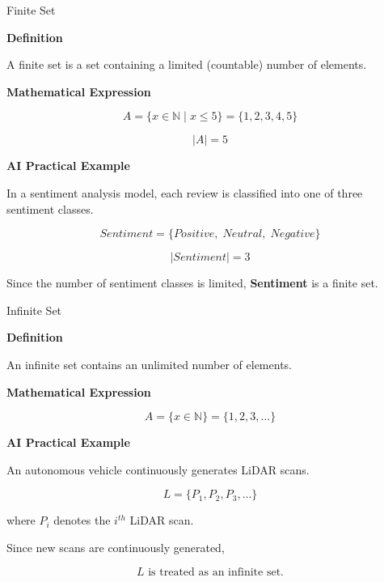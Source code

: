 \documentclass[aspectratio=169]{beamer}
\begin{document}
\begin{frame}{Finite Set}

\textbf{Definition}

A finite set is a set containing a limited (countable) number of elements.

\vspace{0.3cm}

\textbf{Mathematical Expression}

\[
A=\{x\in\mathbb{N}\mid x\le5\}
=\{1,2,3,4,5\}
\]

\[
|A|=5
\]

\vspace{0.4cm}

\textbf{AI Practical Example}

In a sentiment analysis model, each review is classified into one of three sentiment classes.

\[
Sentiment=
\{
Positive,\;
Neutral,\;
Negative
\}
\]

\[
|Sentiment|=3
\]

Since the number of sentiment classes is limited, \textbf{Sentiment} is a finite set.

\end{frame}
\begin{frame}{Infinite Set}

\textbf{Definition}

An infinite set contains an unlimited number of elements.

\vspace{0.3cm}

\textbf{Mathematical Expression}

\[
A=\{x\in\mathbb N\}
=\{1,2,3,\ldots\}
\]

\vspace{0.3cm}

\textbf{AI Practical Example}

An autonomous vehicle continuously generates LiDAR scans.

\[
L=\{P_1,P_2,P_3,\ldots\}
\]

where \(P_i\) denotes the \(i^{th}\) LiDAR scan.

Since new scans are continuously generated,

\[
L \text{ is treated as an infinite set.}
\]

\end{frame}
\end{document}
